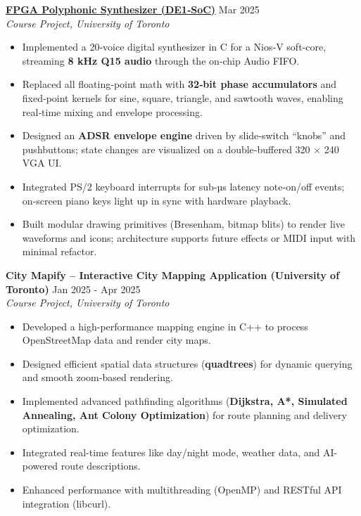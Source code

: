 \documentclass[letterpaper,10pt]{article}
\begin{document}
\vspace{0.3cm}
\noindent\href{https://github.com/alexzjm/ece243-sound-synthesizer}{\uline{
\textbf{FPGA Polyphonic Synthesizer (DE1‑SoC)}}} \hfill Mar 2025\\
\textit{Course Project, University of Toronto}
\begin{itemize}[leftmargin=0.2in]
    \item Implemented a 20‑voice digital synthesizer in C for a Nios‑V soft‑core, streaming \textbf{8 kHz Q15 audio} through the on‑chip Audio FIFO.  
    \item Replaced all floating‑point math with \textbf{32‑bit phase accumulators} and fixed‑point kernels for sine, square, triangle, and sawtooth waves, enabling real‑time mixing and envelope processing.  
    \item Designed an \textbf{ADSR envelope engine} driven by slide‑switch “knobs” and pushbuttons; state changes are visualized on a double‑buffered 320 × 240 VGA UI.  
    \item Integrated PS/2 keyboard interrupts for sub‑µs latency note‑on/off events; on‑screen piano keys light up in sync with hardware playback.  
    \item Built modular drawing primitives (Bresenham, bitmap blits) to render live waveforms and icons; architecture supports future effects or MIDI input with minimal refactor.  
\end{itemize}


\vspace{0.3cm}
\noindent\textbf{City Mapify – Interactive City Mapping Application (University of Toronto)} \hfill Jan 2025 - Apr 2025\\
\textit{Course Project, University of Toronto}
\begin{itemize}[leftmargin=0.2in]
    \item Developed a high-performance mapping engine in C++ to process OpenStreetMap data and render city maps.
    \item Designed efficient spatial data structures (\textbf{quadtrees}) for dynamic querying and smooth zoom-based rendering.
    \item Implemented advanced pathfinding algorithms (\textbf{Dijkstra, A*, Simulated Annealing, Ant Colony Optimization}) for route planning and delivery optimization.
    \item Integrated real-time features like day/night mode, weather data, and AI-powered route descriptions.
    \item Enhanced performance with multithreading (OpenMP) and RESTful API integration (libcurl).
\end{itemize}
\end{document}
